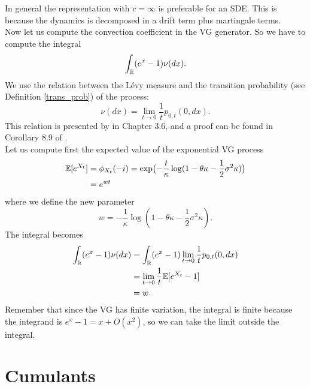 In general the representation with $c = \infty$ is preferable for an SDE. This is because the dynamics is decomposed in a 
drift term plus martingale terms. \\

Now let us compute the convection coefficient in the VG generator. So we have to compute the integral
$$ \int_{\mathbb{R}} (e^x-1) \nu(dx). $$
We use the relation between the Lévy measure and the transition probability (see Definition \ref{trans_prob}) of the process:
\begin{equation}
 \nu(dx) = \lim_{t\to 0} \frac{1}{t} p_{0,t}(0,dx) .
\end{equation}
This relation is presented by \cite{Cont} in Chapter 3.6, and a proof can be found in Corollary 8.9 of \cite{Sato}. \\
Let us compute first the expected value of the exponential VG process
\begin{align*}
\mathbb{E}[ e^{X_t}] &= \phi_{X_t}(-i) = \exp \bigl( -\frac{t}{\kappa} \log(1-\theta \kappa -\frac{1}{2}\sigma^2 \kappa ) \bigr)\\
 &= e^{w t}
\end{align*}
where we define the new parameter 
\begin{equation}
 w = - \frac{1}{\kappa} \log(1-\theta \kappa -\frac{1}{2}\sigma^2 \kappa).
\end{equation}
The integral becomes
\begin{align*}
 \int_{\mathbb{R}} (e^x-1) \nu(dx) &= \int_{\mathbb{R}} (e^x-1) \lim_{t\to 0} \frac{1}{t} p_{0,t}(0,dx) \\ 
         &= \lim_{t\to 0} \frac{1}{t} \mathbb{E}[ e^{X_t} - 1 ] \\
         &= w.
\end{align*}
Remember that since the VG has finite variation, the integral is finite because the integrand is $e^x-1 = x + O(x^2)$,
so we can take the limit outside the integral.\\





\section{Cumulants}\label{cumulant_sec}

